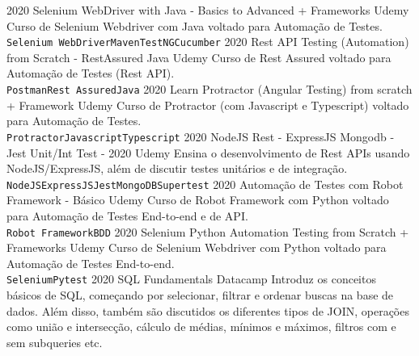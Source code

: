 \documentclass[9pt]{developercv} %
\begin{document}
\begin{entrylist}
	\entry
		{2020}%
		{Selenium WebDriver with Java - Basics to Advanced + Frameworks}
		{Udemy}
		{Curso de Selenium Webdriver com Java voltado para Automação de Testes.\\ 
		\texttt{Selenium WebDriver}\slashsep\texttt{Maven}\slashsep\texttt{TestNG}\slashsep\texttt{Cucumber}}
	\entry
		{2020}%
		{Rest API Testing (Automation) from Scratch - RestAssured Java}
		{Udemy}
		{Curso de Rest Assured voltado para Automação de Testes (Rest API).\\
		\texttt{Postman}\slashsep\texttt{Rest Assured}\slashsep\texttt{Java}}
	\entry
		{2020}
		{Learn Protractor (Angular Testing) from scratch + Framework}
		{Udemy}
		{Curso de Protractor (com Javascript e Typescript) voltado para Automação de Testes.\\ \texttt{Protractor}\slashsep\texttt{Javascript}\slashsep\texttt{Typescript}}
	\entry
		{2020}%
		{NodeJS Rest - ExpressJS Mongodb - Jest Unit/Int Test - 2020}
		{Udemy}
		{Ensina o desenvolvimento de Rest APIs usando NodeJS/ExpressJS, além de discutir testes unitários e de integração.\\
		\texttt{NodeJS}\slashsep\texttt{ExpressJS}\slashsep\texttt{Jest}\slashsep\texttt{MongoDB}\slashsep\texttt{Supertest}}
	\entry
		{2020}%
		{Automação de Testes com Robot Framework - Básico}
		{Udemy}
		{Curso de Robot Framework com Python voltado para Automação de Testes End-to-end e de API.\\ 
		\texttt{Robot Framework}\slashsep\texttt{BDD}}
	\entry
		{2020}%
		{Selenium Python Automation Testing from Scratch + Frameworks}
		{Udemy}
		{Curso de Selenium Webdriver com Python voltado para Automação de Testes End-to-end.\\ 
		\texttt{Selenium}\slashsep\texttt{Pytest}}
		\entry
		{2020}%
		{SQL Fundamentals}
		{Datacamp}
		{Introduz os conceitos básicos de SQL, começando por selecionar, filtrar e ordenar buscas na base de dados. Além disso, também são discutidos os diferentes tipos de JOIN, operações como união e intersecção, cálculo de médias, mínimos e máximos, filtros com e sem subqueries etc.\\ 
}
\end{entrylist}
\end{document}
